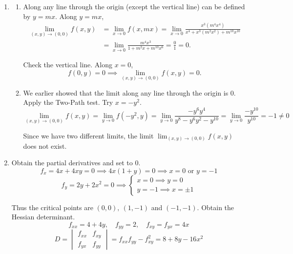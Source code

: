 \documentclass[a4paper, 12pt]{article}
\begin{document}
\begin{enumerate}[leftmargin=*,label=\textbf{\arabic*.}]
\begin{enumerate}[leftmargin=*,label=\textbf{\alph*.}]
Factor $x$ in the first equation.
\[x(2y+x)=0\implies x=0\text{ or }x=-2y\]

Consider the second equation with the relations found above.
\[3x^2+10y=0\implies\left\{\begin{array}{l}x=0\implies y=0\\x=-2y\implies y(12y+10)=1\implies y=0\text{ or }y=-\frac{10}{12}\end{array}\right.\]

All the points are $\boxed{(x,y)=(0,0)\text{ and }(x,y)=\left(\frac53,-\frac{5}{6}\right)}$.

\end{enumerate}

\item \begin{enumerate}[leftmargin=*,label=\textbf{\alph*.}]
\item Along any line through the origin (except the vertical line) can be defined by $y=mx$. Along $y=mx$,
\begin{align*}\lim_{(x,y)\to(0,0)}f(x,y)&=\lim_{x\to0}f(x,mx)=\lim_{x\to0}\frac{x^3(m^4x^4)}{x^4+x^3(m^2x^2)+m^{10}x^{10}}\\[1em]&=\lim_{x\to0}\frac{m^4x^3}{1+m^2x+m^{10}x^6}=\frac01=\boxed0.\end{align*}

Check the vertical line. Along $x=0$,
\[f(0,y)=0\implies\lim_{(x,y)\to(0,0)}f(x,y)=\boxed0.\]

\item We earlier showed that the limit along any line through the origin is $0$. Apply the Two-Path test. Try $x=-y^2$.
\[\lim_{(x,y)\to(0,0)}f(x,y)=\lim_{y\to0}f\left(-y^2,y\right)=\lim_{y\to0}\frac{-y^6y^4}{y^8-y^6y^2-y^{10}}=\lim_{y\to0}\frac{-y^{10}}{y^{10}}=-1\neq0\]

Since we have two different limits, the limit $\displaystyle\lim_{(x,y)\to(0,0)}f(x,y)$ does not exist.

\end{enumerate}

\item Obtain the partial derivatives and set to $0$.
\[f_x=4x+4xy=0\implies 4x(1+y)=0\implies x=0 \text{ or } y=-1\]
\[f_y=2y+2x^2=0\implies\left\{\begin{array}{l}x=0\implies y=0\\ y=-1\implies x=\pm 1\end{array}\right.\]

Thus the critical points are $(0,0),~(1,-1)$ and $(-1,-1)$. Obtain the Hessian determinant.
\[f_{xx}=4+4y,\quad f_{yy}=2,\quad f_{xy}=f_{yx}=4x\]
\[D=\begin{vmatrix}f_{xx} & f_{xy} \\f_{yx} & f_{yy}\end{vmatrix}=f_{xx}f_{yy}-f_{xy}^2=8+8y-16x^2\]


\end{enumerate}
\end{document}
